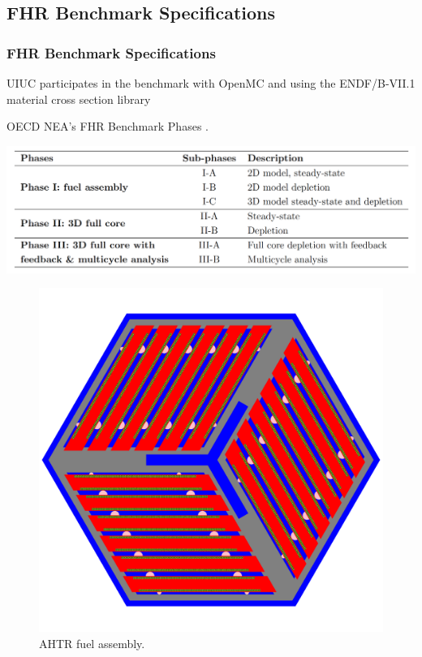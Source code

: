 \subsection*{FHR Benchmark Specifications}
\begin{frame}
    \frametitle{FHR Benchmark Specifications}
    UIUC participates in the benchmark with OpenMC and using the ENDF/B-VII.1 material 
    cross section library
    \vspace{-0.2cm}
    \begin{table}
        \caption{OECD NEA's FHR Benchmark Phases 
        \cite{petrovic_benchmark_2021}.}
        \vspace{-0.25cm}
        \includegraphics[width=0.7\linewidth]{figures/benchmark-phases.png} 
    \end{table}
    \vspace{-0.3cm}
    \begin{figure}[]
        \includegraphics[width=0.27\linewidth]{../docs/figures/ahtr-fuel-element.png} 
        \vspace{-0.2cm}
        \caption{AHTR fuel assembly.}
    \end{figure}
\end{frame}

